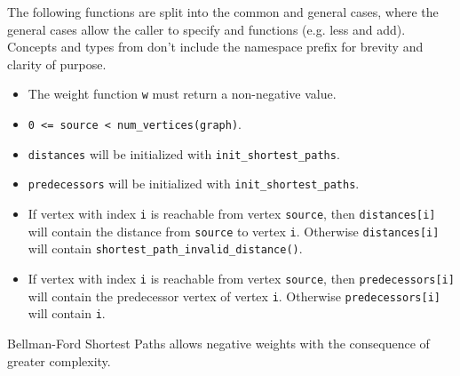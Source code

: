The following functions are split into the common and general cases, where the general cases allow the caller
to specify  and  functions (e.g. less and add). Concepts and types from 
 don't include the namespace prefix for brevity and clarity of purpose.

{\small
      
      
}

\begin{itemdescr}
      \pnum\mandates
            \begin{itemize}
                  \item
                        The weight function \lstinline{w} must return a non-negative value.
            \end{itemize}
      \pnum\preconditions
            \begin{itemize}
                  \item
                        \lstinline{0 <= source < num_vertices(graph)}. 
                  \item
                        \lstinline{distances} will be initialized with \lstinline{init_shortest_paths}.
                  \item
                        \lstinline{predecessors} will be initialized with \lstinline{init_shortest_paths}.
            \end{itemize}
      \pnum\effects
            \begin{itemize}
                  \item
                        If vertex with index \lstinline{i} is reachable from vertex \lstinline{source}, then
                        \lstinline{distances[i]} will contain the distance from \lstinline{source} to vertex
                        \lstinline{i}.  Otherwise \lstinline{distances[i]} will contain
                        \lstinline{shortest_path_invalid_distance()}.
                  \item
                        If vertex with index \lstinline{i} is reachable
                        from vertex \lstinline{source}, then \lstinline{predecessors[i]} will contain the
                        predecessor vertex of vertex \lstinline{i}. Otherwise \lstinline{predecessors[i]} will contain
                        \lstinline{i}.
            \end{itemize}
      \pnum\remarks 
                        Bellman-Ford Shortest Paths allows negative weights with the consequence of greater complexity. \\
\end{itemdescr}


